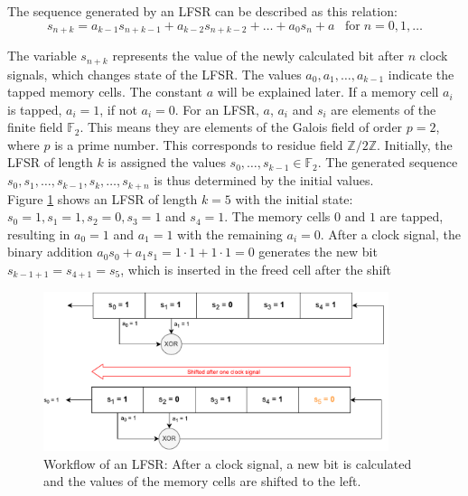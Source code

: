 \pagebreak

The sequence generated by an LFSR can be described as this relation:
\begin{equation*}
s_{n+k}=a_{k-1}s_{n+k-1}+a_{k-2}s_{n+k-2}+\ldots+a_0s_n+a \;\;\;\text{for}\; n = 0,1,\ldots
\end{equation*}

The variable $s_{n+k}$ represents the value of the newly calculated bit after $n$ clock signals, which changes state of the LFSR. The values $a_0,a_1,\ldots,a_{k-1}$ indicate the tapped memory cells. The constant $a$ will be explained later. If a memory cell $a_i$ is tapped, $a_i=1$, if not $a_i=0$. For an LFSR, $a$, $a_i$ and $s_i$ are elements of the finite field $\mathbb{F}_2$. This means they are elements of the Galois field of order $p=2$, where $p$ is a prime number. This corresponds to residue field $\mathbb{Z}/2\mathbb{Z}$. \cite[p. 48]{Lidl.1997} Initially, the LFSR of length $k$ is assigned the values $s_0,\ldots,s_{k-1}\in \mathbb{F}_2$. The generated sequence $s_0,s_1,\ldots,s_{k-1},s_k,\ldots,s_{k+n}$ is thus determined by the initial values. \cite[pp. 186-187]{Lidl.1986} \\

Figure \ref{fig:Figure_4} shows an LFSR of length $k=5$ with the initial state: $s_0=1, s_1=1, s_2=0, s_3=1$ and $s_4=1$. The memory cells $0$ and $1$ are tapped, resulting in $a_0=1$ and $a_1=1$ with the remaining $a_i=0$. After a clock signal, the binary addition $a_0s_0+a_1s_1=1\cdot1+1\cdot1=0$ generates the new bit $s_{k-1+1}=s_{4+1}=s_5$, which is inserted in the freed cell after the shift 

\begin{figure}[h]
	\centering
	\includegraphics[width=0.9\textwidth]{carl/figures/figure_4_svg-raw.pdf}
	\caption{Workflow of an LFSR: After a clock signal, a new bit is calculated and the values of the memory cells are shifted to the left.}
	\label{fig:Figure_4}
\end{figure}

